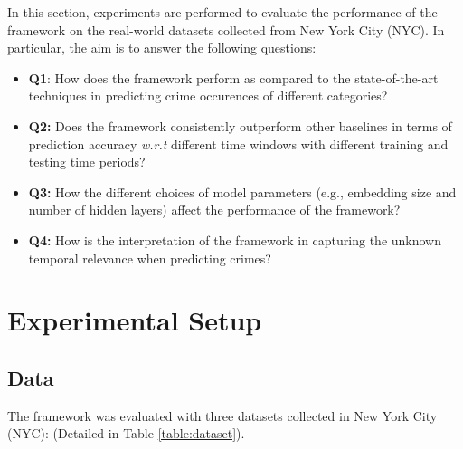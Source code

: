 In this section, experiments are performed to evaluate the performance
of the framework on the real-world datasets collected from New York
City (NYC). In particular, the aim is to answer the following questions:
\begin{itemize}
    \item \textbf{Q1}: How does the framework perform as compared to the state-of-the-art techniques in predicting crime occurences of different categories?
    \item \textbf{Q2:}  Does the framework consistently outperform other baselines in terms of prediction accuracy \emph{w.r.t} different time windows with different training and testing time periods?
    \item \textbf{Q3:} How the different choices of model parameters (e.g., embedding size and number of hidden layers) affect the performance of the framework?
    \item \textbf{Q4:} How is the interpretation of the framework in capturing the unknown temporal relevance when predicting crimes?
\end{itemize}

\section{Experimental Setup}
\subsection{Data}
The framework was evaluated with three datasets collected in New York City (NYC): (Detailed in Table \ref{table:dataset}).

